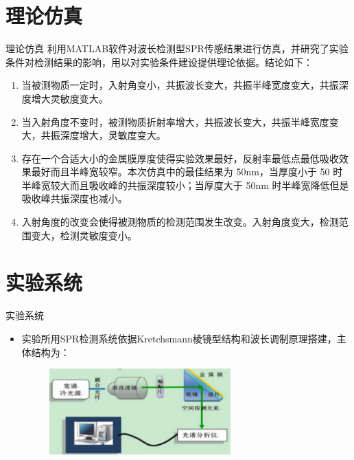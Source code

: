 \documentclass{beamer}
\begin{document}
\section{理论仿真}
\begin{frame}{理论仿真}
  利用MATLAB软件对波长检测型SPR传感结果进行仿真，并研究了实验条件对检测结果的影响，用以对实验条件建设提供理论依据。结论如下：
  \begin{enumerate}
    \item 当被测物质一定时，入射角变小，共振波长变大，共振半峰宽度变大，共振深度增大灵敏度变大。
    \item 当入射角度不变时，被测物质折射率增大，共振波长变大，共振半峰宽度变大，共振深度增大，灵敏度变大。
    \item 存在一个合适大小的金属膜厚度使得实验效果最好，反射率最低点最低吸收效果最好而且半峰宽较窄。本次仿真中的最佳结果为 50nm，当厚度小于 50 时半峰宽较大而且吸收峰的共振深度较小；当厚度大于 50nm 时半峰宽降低但是吸收峰共振深度也减小。
    \item 入射角度的改变会使得被测物质的检测范围发生改变。入射角度变大，检测范围变大，检测灵敏度变小。
  \end{enumerate}
  
\end{frame}

\section{实验系统}
\begin{frame}{实验系统}
  \begin{itemize}
    \item 实验所用SPR检测系统依据Kretchsmann棱镜型结构和波长调制原理搭建，主体结构为：
    \begin{figure}
      \includegraphics[height=3.29cm,width=7cm]{images/2_3.png}
    \end{figure}
  \end{itemize}
  


  
\end{frame}
\end{document}
